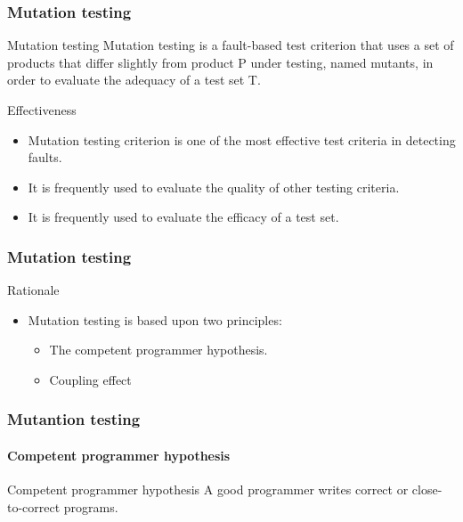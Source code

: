 \begin{frame}[parent={concept:fault-based-testing},hasprev=false,hasnext=true]
\frametitle{Mutation testing}

\begin{block:concept}{Mutation testing}
Mutation testing is a fault-based test criterion that uses a set of products
that differ slightly from product P under testing, named mutants, in order
to evaluate the adequacy of a test set T.
\end{block:concept}

\begin{block:fact}{Effectiveness}
\begin{itemize}
	\item Mutation testing criterion is one of the most effective test
	criteria in detecting faults.

    \item It is frequently used to evaluate the quality of other
    testing criteria.

	\item It is frequently used to evaluate the efficacy of a test set.
\end{itemize}
\end{block:fact}
\end{frame}


\begin{frame}[hasprev=true,hasnext=true]
\frametitle{Mutation testing}

\begin{block:fact}{Rationale}
\begin{itemize}
	\item Mutation testing is based upon two principles:
	\begin{itemize}
		\item The competent programmer hypothesis.

		\item Coupling effect
	\end{itemize}
\end{itemize}
\end{block:fact}
\end{frame}


\begin{frame}
\frametitle{Mutantion testing}
\framesubtitle{Competent programmer hypothesis}

\begin{block:principle}{Competent programmer hypothesis}
A good programmer writes correct or close-to-correct programs.
\end{block:principle}

\end{frame}


